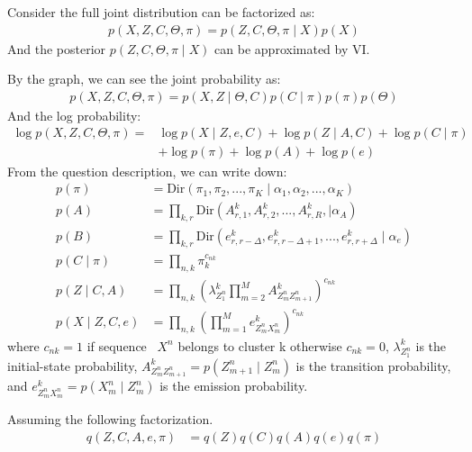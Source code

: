 \documentclass[12pt]{article}
\newenvironment{problem}[2][Problem]{\begin{trivlist}
\item[\hskip \labelsep {\bfseries #1}\hskip \labelsep {\bfseries #2.}]}{\end{trivlist}}
\begin{document}
\pagebreak



\begin{problem}{2.8.24}
Consider the full joint distribution can be factorized as:
\begin{align*}
    p(X, Z, C, \Theta, \pi) = p(Z, C, \Theta, \pi \mid X)p(X)
\end{align*}
And the posterior $p(Z, C, \Theta, \pi \mid X)$ can be approximated by VI.

\medskip
By the graph, we can see the joint probability as:
\begin{align*}
    p(X, Z, C, \Theta, \pi) = p(X, Z \mid \Theta, C) p(C\mid \pi) p(\pi) p(\Theta)
\end{align*}
And the log probability:
\begin{align*}
    \log p(X, Z, C, \Theta, \pi) = 
    &\log p(X \mid Z, e, C) + \log p(Z \mid A, C) + \log p(C\mid \pi)  \\
    & + \log p(\pi) + \log p(A)  + \log p(e)
\end{align*}
From the question description, we can write down:
\begin{align*}
    p(\pi) &= \mathrm{Dir}(\pi_1, \pi_2, ..., \pi_K \mid \alpha_1, \alpha_2, ..., \alpha_K) \\
    p(A) &= \prod_{k,r} \mathrm{Dir}(A^k_{r,1}, A^k_{r,2}, ..., A^k_{r,R},\mid \alpha_A) \\
    p(B) &= \prod_{k,r} \mathrm{Dir}(e^k_{r,r-\Delta}, e^k_{r,r-\Delta +1}, ..., e^k_{r,r+\Delta}\mid \alpha_e) \\
    p(C\mid \pi) &= \prod_{n,k} \pi_k^{c_{nk}} \\
    p(Z\mid C, A) &= \prod_{n,k}(\lambda^k_{Z^n_{1}}
        \prod_{m=2}^{M} A^k_{Z^n_{m}Z^n_{m+1}})^{c_{nk}} \\
    p(X\mid Z, C, e) &= \prod_{n,k} (\prod_{m=1}^{M} e^k_{Z^n_{m}X^n_{m}})^{c_{nk}}
\end{align*}
where $c_{nk}=1$ if sequence ~$X^n$ belongs to cluster k otherwise $c_{nk}=0$,
      $\lambda^k_{Z^n_{1}}$ is the initial-state probability,
      $A^k_{Z^n_{m}Z^n_{m+1}} = p(Z^n_{m+1}\mid Z^n_{m})$ is the transition probability,
  and $e^k_{Z^n_{m}X^n_{m}} = p(X^n_{m}\mid Z^n_{m})$ is the emission probability.

Assuming the following factorization.
\begin{align*}
    q(Z, C, A, e, \pi) &= q(Z)q(C)q(A)q(e)q(\pi)
\end{align*}



\end{problem}
\end{document}
